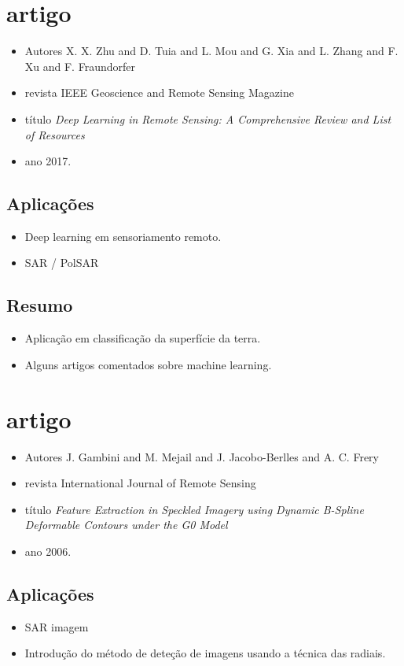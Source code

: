 \documentclass{article}
\begin{document}
\section{artigo \cite{ztmxzxf}}
\begin{itemize}
\item Autores X. X. Zhu and D. Tuia and L. Mou and G. Xia and L. Zhang and F. Xu and F. Fraundorfer
\item revista IEEE Geoscience and Remote Sensing Magazine
\item título \textit{Deep Learning in Remote Sensing: A Comprehensive Review and List of Resources}
\item ano 2017.
\end{itemize}
\subsection{Aplicações}
\begin{itemize}
\item Deep learning em sensoriamento remoto.
\item SAR / PolSAR
\end{itemize}
\subsection{Resumo}
\begin{itemize}
\item Aplicação em classificação da superfície da terra.
\item Alguns artigos comentados sobre machine learning.
 \end{itemize}

\section{artigo \cite{gmbf}}
\begin{itemize}
\item Autores J. Gambini and M. Mejail and J. Jacobo-Berlles and A. C. Frery
\item revista International Journal of Remote Sensing
\item título \textit{Feature Extraction in Speckled Imagery using Dynamic {B}-Spline Deformable Contours under the {G0} Model}
\item ano 2006.
\end{itemize}
\subsection{Aplicações}
\begin{itemize}
\item SAR imagem
\item Introdução do método de deteção de imagens usando a técnica das radiais.
\end{itemize}
\end{document}
